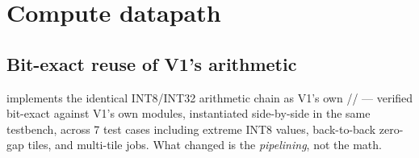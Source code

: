 \chapter{Compute datapath}
\label{ch:datapath}

\section{Bit-exact reuse of V1's arithmetic}
 implements the identical INT8/INT32 arithmetic
chain as V1's own //
--- verified bit-exact against V1's own modules, instantiated side-by-side
in the same testbench, across 7 test cases including extreme INT8 values,
back-to-back zero-gap tiles, and multi-tile jobs. What changed is the
\emph{pipelining}, not the math.

\begin{center}
\end{center}

